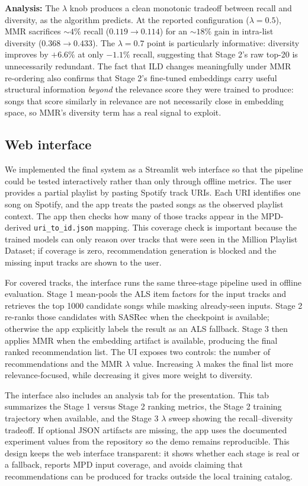 \documentclass[11pt,a4paper]{article}
\begin{document}
\textbf{Analysis:} The $\lambda$ knob produces a clean monotonic tradeoff between recall and diversity, as the algorithm predicts. At the reported configuration ($\lambda = 0.5$), MMR sacrifices $\sim 4\%$ recall ($0.119 \to 0.114$) for an $\sim 18\%$ gain in intra-list diversity ($0.368 \to 0.433$). The $\lambda = 0.7$ point is particularly informative: diversity improves by $+6.6\%$ at only $-1.1\%$ recall, suggesting that Stage 2's raw top-20 is unnecessarily redundant. The fact that ILD changes meaningfully under MMR re-ordering also confirms that Stage 2's fine-tuned embeddings carry useful structural information \emph{beyond} the relevance score they were trained to produce: songs that score similarly in relevance are not necessarily close in embedding space, so MMR's diversity term has a real signal to exploit.

\subsection{Web interface}

We implemented the final system as a Streamlit web interface so that the
pipeline could be tested interactively rather than only through offline metrics.
The user provides a partial playlist by pasting Spotify track URIs. Each URI
identifies one song on Spotify, and the app treats the pasted songs as the
observed playlist context. The app then checks how many of those tracks appear
in the MPD-derived \texttt{uri\_to\_id.json} mapping. This coverage check is
important because the trained models can only reason over tracks that were seen
in the Million Playlist Dataset; if coverage is zero, recommendation generation
is blocked and the missing input tracks are shown to the user.

For covered tracks, the interface runs the same three-stage pipeline used in
offline evaluation. Stage 1 mean-pools the ALS item factors for the input tracks
and retrieves the top 1000 candidate songs while masking already-seen inputs.
Stage 2 re-ranks those candidates with SASRec when the checkpoint is available;
otherwise the app explicitly labels the result as an ALS fallback. Stage 3 then
applies MMR when the embedding artifact is available, producing the final ranked
recommendation list. The UI exposes two controls: the number of recommendations
and the MMR $\lambda$ value. Increasing $\lambda$ makes the final list more
relevance-focused, while decreasing it gives more weight to diversity.

The interface also includes an analysis tab for the presentation. This tab
summarizes the Stage 1 versus Stage 2 ranking metrics, the Stage 2 training
trajectory when available, and the Stage 3 $\lambda$ sweep showing the
recall--diversity tradeoff. If optional JSON artifacts are missing, the app uses
the documented experiment values from the repository so the demo remains
reproducible. This design keeps the web interface transparent: it shows whether
each stage is real or a fallback, reports MPD input coverage, and avoids
claiming that recommendations can be produced for tracks outside the local
training catalog.
\end{document}
